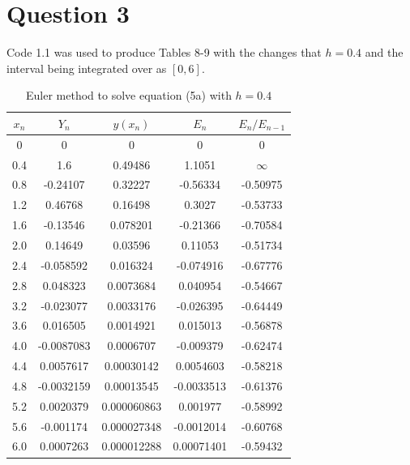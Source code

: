 \documentclass[10pt,a4paper,notitlepage]{article}
\begin{document}
\section*{\centering \large Question 3}
Code 1.1 was used to produce Tables 8-9 with the changes that $h=0.4$ and the interval being integrated over as $[0,6]$.
\begin{table}[H]
\centering
\begin{tabular}{|c|c|c|c|c|}
\hline
$x_{n}$&$Y_{n}$&$y(x_{n})$&$E_{n}$&$E_{n}/E_{n-1}$\\ \hline
0 & 0 & 0 & 0 & 0\\ 0.4 & 1.6 & 0.49486 & 1.1051 & $\infty$ \\ 0.8 & -0.24107 & 0.32227 & -0.56334 & -0.50975\\ 1.2 & 0.46768 & 0.16498 & 0.3027 & -0.53733\\ 1.6 & -0.13546 & 0.078201 & -0.21366 & -0.70584\\ 2.0 & 0.14649 & 0.03596 & 0.11053 & -0.51734\\ 2.4 & -0.058592 & 0.016324 & -0.074916 & -0.67776\\ 2.8 & 0.048323 & 0.0073684 & 0.040954 & -0.54667\\ 3.2 & -0.023077 & 0.0033176 & -0.026395 & -0.64449\\ 3.6 & 0.016505 & 0.0014921 & 0.015013 & -0.56878\\ 4.0 & -0.0087083 & 0.0006707 & -0.009379 & -0.62474\\ 4.4 & 0.0057617 & 0.00030142 & 0.0054603 & -0.58218\\ 4.8 & -0.0032159 & 0.00013545 & -0.0033513 & -0.61376\\ 5.2 & 0.0020379 & 0.000060863 & 0.001977 & -0.58992\\ 5.6 & -0.001174 & 0.000027348 & -0.0012014 & -0.60768\\ 6.0 & 0.0007263 & 0.000012288 & 0.00071401 & -0.59432\\ \hline \end{tabular}
\caption{Euler method to solve equation (5a) with $h=0.4$}
\end{table}
\end{document}
